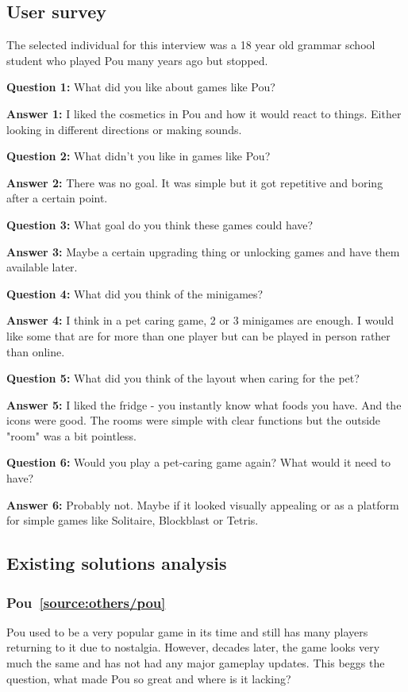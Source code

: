 \documentclass[11pt]{article}
\begin{document}
\subsection{User survey}
The selected individual for this interview was a 18 year old grammar school student who played Pou many years ago but stopped.

\textbf{Question 1:} What did you like about games like Pou?

\textbf{Answer 1:} I liked the cosmetics in Pou and how it would react to things. Either looking in different directions or making sounds.

\textbf{Question 2:} What didn't you like in games like Pou?

\textbf{Answer 2:} There was no goal. It was simple but it got repetitive and boring after a certain point.

\textbf{Question 3:} What goal do you think these games could have?

\textbf{Answer 3:} Maybe a certain upgrading thing or unlocking games and have them available later.

\textbf{Question 4:} What did you think of the minigames?

\textbf{Answer 4:} I think in a pet caring game, 2 or 3 minigames are enough. I would like some that are for more than one player but can be played in person rather than online.

\textbf{Question 5:} What did you think of the layout when caring for the pet?

\textbf{Answer 5:} I liked the fridge - you instantly know what foods you have. And the icons were good. The rooms were simple with clear functions but the outside "room" was a bit pointless.

\textbf{Question 6:} Would you play a pet-caring game again? What would it need to have?

\textbf{Answer 6:} Probably not. Maybe if it looked visually appealing or as a platform for simple games like Solitaire, Blockblast or Tetris.

\subsection{Existing solutions analysis}
    \subsubsection{Pou~\ref{source:others/pou}}
    Pou used to be a very popular game in its time and still has many players returning to it due to nostalgia. However, decades later, the game looks very much the same and has not had any major gameplay updates. This beggs the question, what made Pou so great and where is it lacking?
\end{document}
